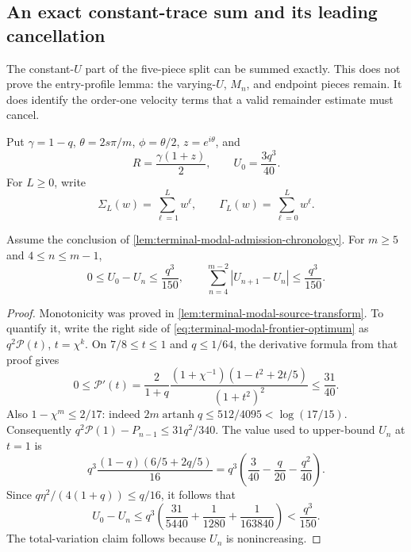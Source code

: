 \subsection{An exact constant-trace sum and its leading cancellation}
\label{sec:terminal-modal-signed-green-addendum}

The constant-$U$ part of the five-piece split can be summed exactly.  This
does not prove the entry-profile lemma: the varying-$U$, $M_n$, and endpoint
pieces remain.  It does identify the order-one velocity terms that a valid
remainder estimate must cancel.

Put $\gamma=1-q$, $\theta=2s\pi/m$, $\phi=\theta/2$, $z=e^{i\theta}$, and
\begin{equation*}
 R=\frac{\gamma(1+z)}2,\qquad U_0=\frac{3q^3}{40}.
\end{equation*}
For $L\geq0$, write
\begin{equation*}
 \Sigma_L(w)=\sum_{\ell=1}^Lw^\ell,\qquad
 \Gamma_L(w)=\sum_{\ell=0}^Lw^\ell.
\end{equation*}

\begin{lemma}
\label{lem:terminal-modal-u-variation}
Assume the conclusion of \cref{lem:terminal-modal-admission-chronology}.
For $m\geq5$ and $4\leq n\leq m-1$,
\begin{equation}
 0\leq U_0-U_n\leq\frac{q^3}{150},\qquad
 \sum_{n=4}^{m-2}|U_{n+1}-U_n|\leq\frac{q^3}{150}.
 \label{eq:terminal-modal-u-variation}
\end{equation}
\end{lemma}

\begin{proof}
Monotonicity was proved in
\cref{lem:terminal-modal-source-transform}.  To quantify it, write the
right side of \eqref{eq:terminal-modal-frontier-optimum} as
$q^2\mathcal P(t)$, $t=\chi^k$.  On $7/8\leq t\leq1$ and $q\leq1/64$,
the derivative formula from that proof gives
\begin{equation*}
 0\leq\mathcal P'(t)
 =\frac2{1+q}\frac{(1+\chi^{-1})(1-t^2+2t/5)}{(1+t^2)^2}
 \leq\frac{31}{40}.
\end{equation*}
Also $1-\chi^m\leq2/17$: indeed
$2m\operatorname{artanh}q\leq512/4095<\log(17/15)$.
Consequently $q^2\mathcal P(1)-P_{n-1}\leq31q^2/340$.  The value used to upper-bound
$U_n$ at $t=1$ is
\[
 q^3\frac{(1-q)(6/5+2q/5)}{16}
 =q^3\left(\frac3{40}-\frac q{20}-\frac{q^2}{40}\right).
\]
Since $q\eta^2/(4(1+q))\leq q/16$, it follows that
\[
 U_0-U_n\leq q^3\left(
 \frac{31}{5440}+\frac1{1280}+\frac1{163840}\right)
 <\frac{q^3}{150}.
\]
The total-variation claim follows because $U_n$ is nonincreasing.
\end{proof}

